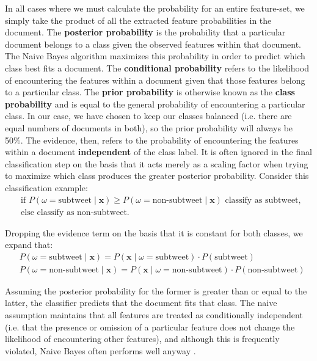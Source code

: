 \documentclass[11pt, twoside, reqno]{book}
\begin{document}
In all cases where we must calculate the probability for an entire feature-set, we simply take the product of all the extracted feature probabilities in the document. The \textbf{posterior probability} is the probability that a particular document belongs to a class given the observed features within that document. The Naive Bayes algorithm maximizes this probability in order to predict which class best fits a document. The \textbf{conditional probability} refers to the likelihood of encountering the features within a document given that those features belong to a particular class. The \textbf{prior probability} is otherwise known as the \textbf{class probability} and is equal to the general probability of encountering a particular class. In our case, we have chosen to keep our classes balanced (i.e. there are equal numbers of documents in both), so the prior probability will always be 50\%. The evidence, then, refers to the probability of encountering the features within a document \textbf{independent} of the class label. It is often ignored in the final classification step on the basis that it acts merely as a scaling factor when trying to maximize which class produces the greater posterior probability. Consider this classification example:
\[
\begin{split} 
	& \text{if } P(  \omega = \text{subtweet} \mid \textbf{x}) \ge P(\omega = \text{non-subtweet} \mid \textbf{x})  \text{ classify as subtweet, }\\
	&  \text{else classify as non-subtweet. }
\end{split}
\]

\noindent 
Dropping the evidence term on the basis that it is constant for both classes, we expand that:
\[
\begin{split} 
	&  P(\omega = \text{subtweet} \mid \textbf{x}) = P(\textbf{x} \mid \omega = \text{subtweet}) \cdot P(\text{subtweet}) \\
	&  P(\omega = \text{non-subtweet} \mid \textbf{x}) = P(\textbf{x} \mid \omega = \text{non-subtweet}) \cdot P(\text{non-subtweet})
\end{split} 
\]

\noindent
Assuming the posterior probability for the former is greater than or equal to the latter, the classifier predicts that the document fits that class. The naive assumption maintains that all features are treated as conditionally independent (i.e. that the presence or omission of a particular feature does not change the likelihood of encountering other features), and although this is frequently violated, Naive Bayes often performs well anyway \cite{naive_bayes_optimality}. 
\end{document}
